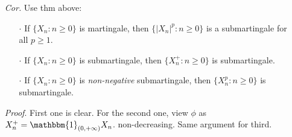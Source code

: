 \documentclass[a4paper,12pt,twoside]{book}
\begin{document}
\begin{itemize}
	\item[\textit{Cor.}] Use thm above:
	\begin{itemize}
		\item[$\cdot$] If $\{X_n: n\geq 0\}$ is martingale, then $\{|X_n|^p: n\geq 0\}$ is a submartingale for all $p\geq 1$.
		\item[$\cdot$] If $\{X_n: n\geq 0\}$ is submartingale, then $\{X_n^+: n\geq 0\}$ is submartingale.
		\item[$\cdot$] If $\{X_n: n\geq 0\}$ is \textit{non-negative} submartingale, then $\{X_n^p: n\geq 0\}$ is submartingale.
	\end{itemize}

	\item[\textit{Proof}.] First one is clear. For the second one, view $\phi$ as $X_n^+ = \mathbbm{1}_{(0,+\infty)}X_n$. non-decreasing. Same argument for third.
\end{itemize}

\end{document}
